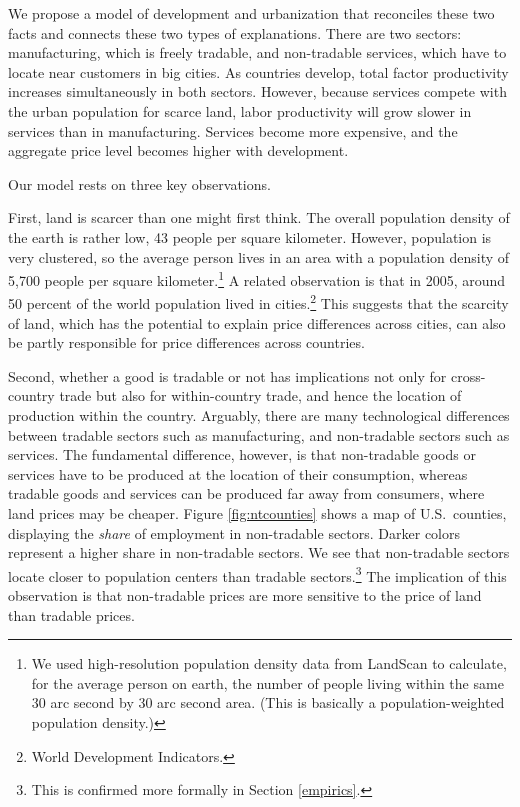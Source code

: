 \documentclass[12pt]{article}
\begin{document}
We propose a model of development and urbanization that reconciles these two facts and connects these two types of explanations. There are two sectors: manufacturing, which is freely tradable, and non-tradable services, which have to locate near customers in big cities. As countries develop, total factor productivity increases simultaneously in both sectors. However, because services compete with the urban population for scarce land, labor productivity will grow slower in services than in manufacturing. Services become more expensive, and the aggregate price level becomes higher with development.

Our model rests on three key observations.

First, land is scarcer than one might first think. The overall population density of the earth is rather low, 43 people per square kilometer.  However, population is very clustered, so the average person lives in an area with a population density of 5,700 people per square kilometer.\footnote{We used high-resolution population density data from LandScan to calculate, for the average person on earth, the number of people living within the same 30 arc second by 30 arc second area. (This is basically a population-weighted population density.) } A related observation is that in 2005, around 50 percent of the world population lived in cities.\footnote{World Development Indicators.} This suggests that the scarcity of land, which has the potential to explain price differences across cities, can also be partly responsible for price differences across countries.

Second, whether a good is tradable or not has implications not only for cross-country trade but also for within-country trade, and hence the location of production within the country. Arguably, there are many technological differences between tradable sectors such as manufacturing, and non-tradable sectors such as services. The fundamental difference, however, is that non-tradable goods or services have to be produced at the location of their consumption, whereas tradable goods and services can be produced far away from consumers, where land prices may be cheaper. Figure \ref{fig:ntcounties} shows a map of U.S.~counties, displaying the \emph{share} of employment in non-tradable sectors. Darker colors represent a higher share in non-tradable sectors. We see that non-tradable sectors locate closer to population centers than tradable sectors.\footnote{This is confirmed more formally in Section \ref{empirics}.} The implication of this observation is that non-tradable prices are more sensitive to the price of land than tradable prices.
\end{document}

